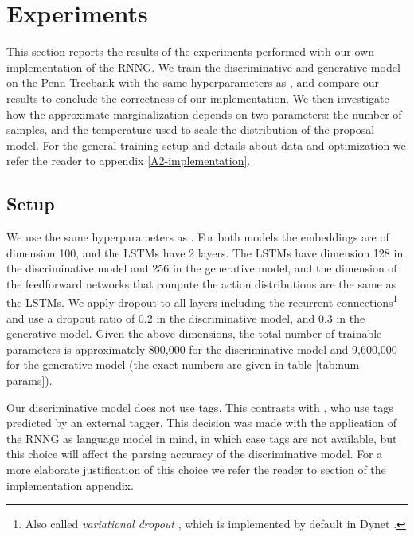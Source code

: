 \section{Experiments}
  This section reports the results of the experiments performed with our own implementation of the RNNG. We train the discriminative and generative model on the Penn Treebank with the same hyperparameters as \citet{dyer2016rnng}, and compare our results to conclude the correctness of our implementation. We then investigate how the approximate marginalization depends on two parameters: the number of samples, and the temperature used to scale the distribution of the proposal model. For the general training setup and details about data and optimization we refer the reader to appendix \ref{A2-implementation}.

  \subsection{Setup}
    We use the same hyperparameters as \citep{dyer2016rnng}. For both models the embeddings are of dimension 100, and the LSTMs have 2 layers. The LSTMs have dimension 128 in the discriminative model and 256 in the generative model, and the dimension of the feedforward networks that compute the action distributions are the same as the LSTMs. We apply dropout to all layers including the recurrent connections\footnote{Also called \textit{variational dropout} \citep{gal2016theoretically}, which is implemented by default in Dynet \citep{neubig2017dynet}.} and use a dropout ratio of 0.2 in the discriminative model, and 0.3 in the generative model. Given the above dimensions, the total number of trainable parameters is approximately 800,000 for the discriminative model and 9,600,000 for the generative model (the exact numbers are given in table \ref{tab:num-params}).

    Our discriminative model does not use tags. This contrasts with \citet{dyer2016rnng}, who use tags predicted by an external tagger. This decision was made with the application of the RNNG as language model in mind, in which case tags are not available, but this choice will affect the parsing accuracy of the discriminative model. For a more elaborate justification of this choice we refer the reader to section \label{sec:impl-embedding} of the implementation appendix.

